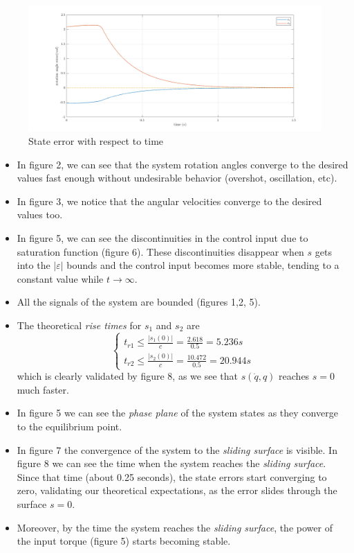 \documentclass[a4paper]{article}
\begin{document}
\begin{figure}[H]
    \centering
    \includegraphics[width=15cm]{fig/sim1/e.png}
    \caption{State error with respect to time}
\end{figure}

\noindent\hspace{-2pt}
\begin{itemize}
    \item In figure 2, we can see that the system rotation angles converge to the desired values fast enough without undesirable behavior (overshot, oscillation, etc).
    \item In figure 3, we notice that the angular velocities converge to the desired values too. 
    \item In figure 5, we can see the discontinuities in the control input due to saturation function (figure 6). These discontinuities disappear when $s$ gets into 
    the $|\varepsilon|$ bounds and the control input becomes more stable, tending to a constant value while $t \rightarrow \infty$. 
    \item All the signals of the system are bounded (figures 1,2, 5).
    \item The theoretical \textit{rise times} for $s_1$ and $s_2$ are 
    $$  \begin{cases}
            t_{r1} \le \frac{|s_1(0)|}{c} = \frac{2.618}{0.5} = 5.236 s\\
            t_{r2} \le \frac{|s_2(0)|}{c} = \frac{10.472}{0.5} = 20.944 s
        \end{cases} 
    $$
    which is clearly validated by figure 8, as we see that $s(\dot{q}, q)$ reaches $s=0$ much faster.
    \item In figure 5 we can see the \textit{phase plane} of the system states as they converge to the equilibrium point.
    \item In figure 7 the convergence of the system to the \textit{sliding surface} is visible. In figure 8 we can see the time 
    when the system reaches the \textit{sliding surface}. Since that time (about 0.25 seconds), the state errors start converging 
    to zero, validating our theoretical expectations, as the error slides through the surface $s=0$.
    \item Moreover, by the time the system reaches the \textit{sliding surface}, the power of the input torque (figure 5) starts 
    becoming stable.
\end{itemize}
\end{document}
